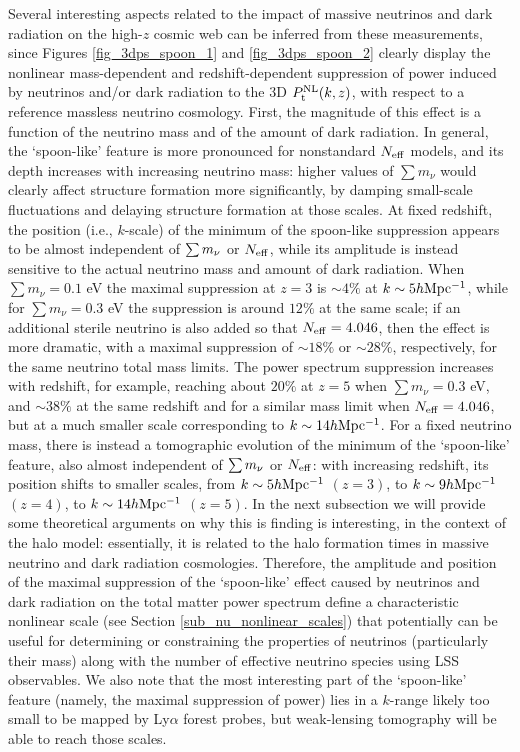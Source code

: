 \documentclass{emulateapj}
\begin{document}
Several interesting aspects related to the impact of massive neutrinos and dark radiation on the high-$z$ cosmic web
can be inferred from these measurements, since Figures \ref{fig_3dps_spoon_1} and
\ref{fig_3dps_spoon_2} clearly display
the nonlinear mass-dependent and redshift-dependent suppression of power 
induced by  neutrinos and/or dark radiation
to the 3D $P^{\rm NL}_{\rm t}(k,z)$,
with respect to a reference massless neutrino cosmology. 
First, the magnitude of this effect is a function of the neutrino mass and of the amount of dark radiation. In general, 
the `spoon-like' feature is more pronounced for nonstandard $N_{\rm eff}$ models, and its depth 
increases with increasing neutrino mass: higher values of $\sum m_{\nu}$ would clearly affect structure formation more significantly, by  damping small-scale fluctuations and delaying structure formation at those scales. 
At fixed redshift, the position (i.e., $k$-scale) of the minimum of the spoon-like suppression appears to be almost independent of $\sum m_{\rm \nu}$ or $N_{\rm eff}$,
while  its amplitude is instead sensitive to the actual neutrino mass and amount of dark radiation. 
When $\sum m_{\nu}=0.1$ eV the maximal suppression at $z=3$ is $\sim4\%$ at $k\sim 5h{\rm Mpc^{-1}}$, while 
for $\sum m_{\nu}=0.3$ eV the suppression is around $12\%$ at the same scale;
if an additional sterile neutrino is also added so that $N_{\rm eff}=4.046$, then the effect is more dramatic, with a maximal suppression
of $\sim 18\%$ or $\sim 28\%$, respectively, for the same neutrino total mass limits.
The power spectrum suppression increases with redshift, for example, reaching about $20\%$ at $z=5$
when $\sum m_{\nu}=0.3$ eV, and $\sim 38\%$ at the same redshift and for a similar mass limit when $N_{\rm eff}=4.046$, but at 
a much smaller scale corresponding to $k \sim 14 h{\rm Mpc^{-1}}$.
For a fixed neutrino mass, there is instead a tomographic evolution of the minimum of the `spoon-like' feature, also almost independent of $\sum m_{\rm \nu}$ or $N_{\rm eff}$: 
with increasing redshift, its position shifts to smaller scales, from $k \sim 5h{\rm Mpc^{-1}}$ $(z=3)$,  to $k \sim 9h{\rm Mpc^{-1}}$ $(z=4)$,  to $k \sim 14h{\rm Mpc^{-1}}$ $(z=5)$.  
In the next subsection we will provide some theoretical arguments on 
why this is finding is interesting, in the context of the halo model:
essentially, it is related to the halo formation times in massive neutrino and dark radiation cosmologies. 
Therefore, the amplitude and position of the maximal suppression of the `spoon-like' effect 
 caused by neutrinos and dark radiation on the total matter power spectrum define a characteristic nonlinear scale 
 (see Section \ref{sub_nu_nonlinear_scales}) that potentially can be useful for 
determining or constraining the properties of  neutrinos (particularly their mass) along with the number of effective neutrino species
using LSS observables. We also note that the most interesting part of the `spoon-like' feature (namely, the maximal suppression of power) lies in a $k$-range likely too small 
to be mapped by Ly$\alpha$ forest probes, but weak-lensing tomography will be 
able to reach those scales.
  
\end{document}
